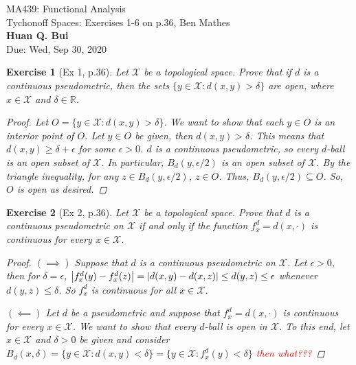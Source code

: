 \documentclass[11pt]{article}
\newtheorem{exercise}{Exercise}
\newcommand{\R}{\mathbb{R}}
\newcommand{\X}{\mathcal{X}}
\begin{document}
\begin{center}
\begin{framed}
{\Large  MA439: Functional Analysis\\
	 Tychonoff Spaces:  Exercises 1-6 on p.36, Ben Mathes}\\
$\,$\\
{\Large \bf  Huan Q. Bui\\}
$\,$\\
{\Large Due: Wed, Sep 30, 2020}
\end{framed}
\end{center}

\begin{exercise}[Ex 1, p.36]
	Let $\X$ be a topological space. Prove that if $d$ is a continuous pseudometric, then the sets $\{ y \in \X : d(x,y) > \delta \}$ are open, where $x\in \X$ and $\delta \in \R$.  
	\begin{proof}
		Let $O = \{ y \in \X : d(x,y) > \delta \}$. We want to show that each $y\in O$ is an interior point of $O$. Let $y\in O$ be given, then $d(x,y) > \delta$. This means that $d(x,y) \geq \delta + \epsilon$ for some $\epsilon > 0$. $d$ is a continuous pseudometric, so every $d$-ball is an open subset of $\X$. In particular, $B_d(y,\epsilon/2)$ is an open subset of $\X$. By the triangle inequality, for any $z\in B_d(y,\epsilon/2)$, $z\in O$. Thus, $B_d(y,\epsilon/2) \subseteq O$. So, $O$ is open as desired.  
 	\end{proof}
\end{exercise}

\begin{exercise}[Ex 2, p.36]
	Let $\X$ be a topological space. Prove that $d$ is a continuous pseudometric on $\X$ if and only if the function $f_x^d = d(x,\cdot)$ is continuous for every $x\in \X$.
	\begin{proof}
		$(\implies)$ Suppose that $d$ is a continuous pseudometric on $\X$. Let $\epsilon > 0$, then for $\delta = \epsilon$, $\abs{f_x^d(y) - f_x^d(z)} = \abs{d(x,y) - d(x,z)} \leq d(y,z) \leq \epsilon$ whenever $d(y,z) \leq \delta$. So $f_x^d$ is continuous for all $x\in \X$.  
		
		$(\impliedby)$ Let $d$ be a pseudometric and suppose that $f_x^d = d(x,\cdot)$ is continuous for every $x\in \X$. We want to show that every $d$-ball is open in $\X$. To this end, let $x\in \X$ and $\delta > 0$ be given and consider $B_d(x,\delta) = \{ y\in \X : d(x,y) < \delta  \} = \{ y\in \X : f_x^d(y) < \delta \}$ \textcolor{red}{then what???}
	\end{proof}
\end{exercise}
\end{document}
